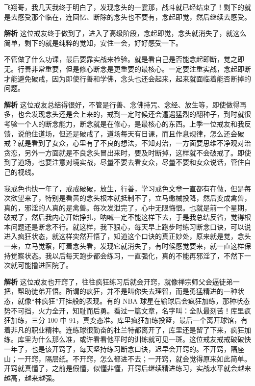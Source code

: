 \begin{case}[直接觉察消灭]
    飞翔哥，我几天我终于明白了，发现念头的一霎那，战斗就已经结束了！剩下的就是去感受那个临在，连回忆、断除的念头也不要有，念起即觉，然后继续去感受。

    \textbf{解析} 这位戒友终于做到了，进入了高级阶段，念起即觉，念头就消失了，就这么简单，剩下的就是纯粹的觉知，安住一会，好好感受一下。
\end{case}

\begin{case}[直接觉察消灭]
    不管做了什么功课，最后要靠实战来检验。就是看自己是否能念起即断，觉之即无。行善非常重要，但是修心断念是更重要的最核心。一定要注重实战，念起即断才能避免破戒，因为即使行善和学佛，念头也还会起来，起来就面临着能否断掉的问题。

    \textbf{解析} 这位戒友总结得很好，不管是行善、念佛持咒、念经、放生等，即使做得再多，也会发现念头还是会上来的，戒到一定时候还会遭遇猛烈的翻种子，到时就很考验一个人的断念能力，断念就是在修心，是最核心的东西。上季一位戒友和我反馈，说他住道场，但还是破戒了，道场每天有日课，而且作息规律，怎么还会破戒？就是看到了女众，心里有了不良的想法，不知对治，一方面要思维不净观对治贪恋，另外一方面就是不良念头冒出来时，要及时断掉，这样就不会破戒了。即使到了道场，也要注意对境实战，尽量不要去看女众，尽量不要和女众说话，管住自己的视线。
\end{case}

\begin{case}[直接觉察消灭]
    我戒色也快一年了，戒戒破破，放生，行善，学习戒色文章一直都有在做，但是每次欲望来了，特别是看黄的念头根本就抵制不了，立马缴械投降，然后变成禽兽，真的，邪淫的人真的是禽兽。每次发泄完了，心中无限悔恨。也就是前一个星期，破戒了，然后我内心开始挣扎，呐喊一定不能这样下去，于是我总结反省，觉得根本问题还是断念不行。就这样，我下狠心，每天早上跑步时练习断念口诀，可以说进入疯狂状态，就这样突然开悟了，知道这个口诀的真正妙处，原来就是觉，念头一来，立马觉察，盯着念头看，发现它就消失了，有时候感觉要来，就一直这样保持觉察状态。我以后每天跑步都会练习，一直强化，真的不能再邪淫了，不然下一次就可能撸进医院了。

    \textbf{解析} 这位戒友也开窍了，往往疯狂练习后就会开窍，就像禅宗师父会逼徒弟一把，帮助徒弟开悟。所谓的疯狂，并不是叫你失去理智，而是勇猛精进的一种状态，就像“林疯狂”开挂般的表现。有的 NBA 球星在输球后会疯狂加练，那种状态势不可挡，火力全开，知耻而后勇。看过一篇文章，名字叫：全队最刻苦！库里疯狂加练，三分 100 中 91，真变态准。库里疯狂加练投篮，最后一个离开球馆，有着非凡的职业精神。连练球很勤奋的杜兰特都离开了，库里还是留了下来，疯狂加练。库里为什么那么准，或许看看他平时的训练就可见一斑。这位戒友戒戒破破快一年了，也是该开窍了，每天坚持练习断念口诀，迟早会开窍的。不开窍，隔座山；一开窍，隔层纸。不开窍，怎么都进不去；一开窍，就会觉得原来如此简单。开窍就真懂了，之前是假懂，似懂非懂，开窍后继续精进练习，实战水平就会越来越高，越来越强。
\end{case}

